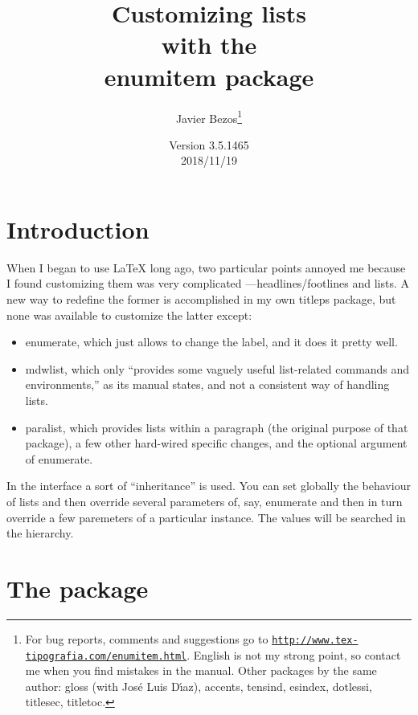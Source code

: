 \documentclass[a4paper]{ltxguide}
\title{Customizing lists\\with the\\\textsf{enumitem} package}
\author{Javier Bezos\footnote{For bug reports, comments and
suggestions go to \href{http://www.tex-tipografia.com/enumitem.html}%
{\texttt{http://www.tex-tipografia.com/enumitem.html}}.
English is not my strong point, so contact me when you
find mistakes in the manual. Other packages by the same author:
\textsf{gloss} (with Jos\'e Luis D\'{\i}az), \textsf{accents,
tensind, esindex, dotlessi, titlesec, titletoc}.}}
\date{Version 3.5.1465\\2018/11/19}
\newcommand\3{\unskip\enspace\fbox{\fontsize{4}{4}\selectfont NEW 3.0}}
\begin{document}
\maketitle
\tableofcontents

\section{Introduction}

When I began to use \LaTeX{} long ago, two particular points
annoyed me because I found customizing them was very complicated
---headlines/footlines and lists.  A new way to redefine the former is
accomplished in my own \textsf{titleps} package, but none was
available to customize the latter except:
\begin{itemize}
\item \textsf{enumerate}, which just allows to change the label, and
it does it pretty well.

\item \textsf{mdwlist}, which only ``provides some vaguely useful
list-related commands and environments,'' as its manual states, and not
a consistent way of handling lists.

\item \textsf{paralist}, which provides lists within a paragraph (the
original purpose of that package), a few other hard-wired specific
changes, and the optional argument of \textsf{enumerate}.
\end{itemize}

In the interface a sort of ``inheritance'' is used. You can set
globally the behaviour of lists and then override several parameters
of, say, enumerate and then in turn override a few paremeters of a
particular instance. The values will be searched in the hierarchy.

\section{The package}
\end{document}
